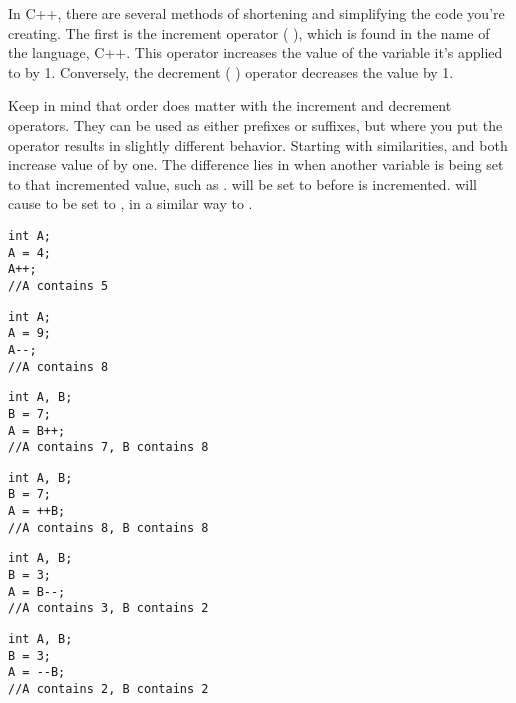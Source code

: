 In C++, there are several methods of shortening and simplifying the code you're creating. 
The first is the increment operator ( \Code{++} ), which is found in the name of the language, C++.
This operator increases the value of the variable it's applied to by 1. 
Conversely, the decrement ( \Code{--} ) operator decreases the value by 1.

Keep in mind that order does matter with the increment and decrement operators. 
They can be used as either prefixes or suffixes, but where you put the operator results in slightly different behavior. 
Starting with similarities,  and  both increase value of  by one. 
The difference lies in when another variable is being set to that incremented value, such as . 
 will be set to  before  is incremented. 
 will cause  to be set to , in a similar way to .

\noindent\begin{minipage}{\linewidth}\begin{lstlisting}
int A;
A = 4;
A++;
//A contains 5
\end{lstlisting}\end{minipage}
\noindent\begin{minipage}{\linewidth}\begin{lstlisting}
int A;
A = 9;
A--;
//A contains 8
\end{lstlisting}\end{minipage}
\noindent\begin{minipage}{\linewidth}\begin{lstlisting}
int A, B;
B = 7;
A = B++;
//A contains 7, B contains 8
\end{lstlisting}\end{minipage}
\noindent\begin{minipage}{\linewidth}\begin{lstlisting}
int A, B;
B = 7;
A = ++B;
//A contains 8, B contains 8
\end{lstlisting}\end{minipage}
\noindent\begin{minipage}{\linewidth}\begin{lstlisting}
int A, B;
B = 3;
A = B--;
//A contains 3, B contains 2
\end{lstlisting}\end{minipage}
\noindent\begin{minipage}{\linewidth}\begin{lstlisting}
int A, B;
B = 3;
A = --B;
//A contains 2, B contains 2
\end{lstlisting}\end{minipage}

